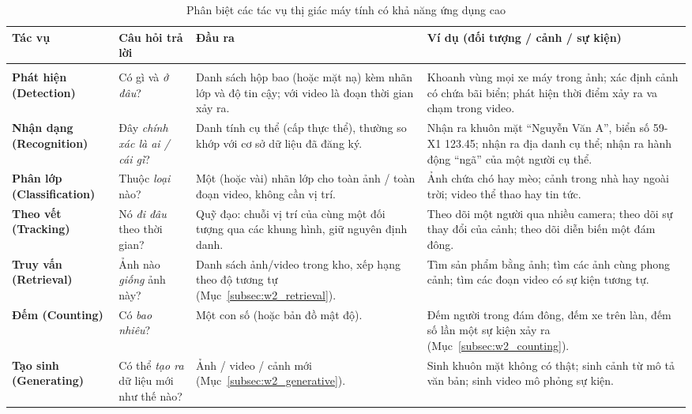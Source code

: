 \begin{table}[ht]
\centering
\scriptsize
\setlength{\tabcolsep}{3pt}
\caption{Phân biệt các tác vụ thị giác máy tính có khả năng ứng dụng cao}
\label{tab:w2_tasks}
\renewcommand{\arraystretch}{1.3}
\begin{tabularx}{\textwidth}{|>{\raggedright\arraybackslash}p{2.1cm}|>{\raggedright\arraybackslash}p{2.6cm}|>{\raggedright\arraybackslash}X|>{\raggedright\arraybackslash}X|}
\hline
\textbf{Tác vụ} & \textbf{Câu hỏi trả lời} & \textbf{Đầu ra} & \textbf{Ví dụ (đối tượng / cảnh / sự kiện)} \\
\hline
\multicolumn{4}{|l|}{\textbf{Nhóm 1: Hiểu dữ liệu thị giác (Visual Data Understanding)}} \\
\hline
\textbf{Phát hiện (Detection)} & Có gì và \emph{ở đâu}? & Danh sách hộp bao (hoặc mặt nạ) kèm nhãn lớp và độ tin cậy; với video là đoạn thời gian xảy ra. & Khoanh vùng mọi xe máy trong ảnh; xác định cảnh có chứa bãi biển; phát hiện thời điểm xảy ra va chạm trong video. \\
\hline
\textbf{Nhận dạng (Recognition)} & Đây \emph{chính xác là ai / cái gì}? & Danh tính cụ thể (cấp thực thể), thường so khớp với cơ sở dữ liệu đã đăng ký. & Nhận ra khuôn mặt ``Nguyễn Văn A'', biển số 59-X1 123.45; nhận ra địa danh cụ thể; nhận ra hành động ``ngã'' của một người cụ thể. \\
\hline
\textbf{Phân lớp (Classification)} & Thuộc \emph{loại} nào? & Một (hoặc vài) nhãn lớp cho toàn ảnh / toàn đoạn video, không cần vị trí. & Ảnh chứa chó hay mèo; cảnh trong nhà hay ngoài trời; video thể thao hay tin tức. \\
\hline
\textbf{Theo vết (Tracking)} & Nó \emph{đi đâu} theo thời gian? & Quỹ đạo: chuỗi vị trí của cùng một đối tượng qua các khung hình, giữ nguyên định danh. & Theo dõi một người qua nhiều camera; theo dõi sự thay đổi của cảnh; theo dõi diễn biến một đám đông. \\
\hline
\textbf{Truy vấn (Retrieval)} & Ảnh nào \emph{giống} ảnh này? & Danh sách ảnh/video trong kho, xếp hạng theo độ tương tự (Mục~\ref{subsec:w2_retrieval}). & Tìm sản phẩm bằng ảnh; tìm các ảnh cùng phong cảnh; tìm các đoạn video có sự kiện tương tự. \\
\hline
\textbf{Đếm (Counting)} & Có \emph{bao nhiêu}? & Một con số (hoặc bản đồ mật độ). & Đếm người trong đám đông, đếm xe trên làn, đếm số lần một sự kiện xảy ra (Mục~\ref{subsec:w2_counting}). \\
\hline
\textbf{Tạo sinh (Generating)} & Có thể \emph{tạo ra} dữ liệu mới như thế nào? & Ảnh / video / cảnh mới (Mục~\ref{subsec:w2_generative}). & Sinh khuôn mặt không có thật; sinh cảnh từ mô tả văn bản; sinh video mô phỏng sự kiện. \\

\end{tabularx}
\end{table}
